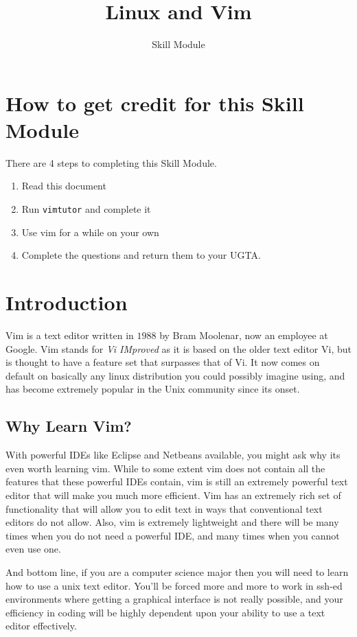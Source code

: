 

\title{Linux and Vim}
\author{Skill Module}
\date{}


\maketitle

\section{How to get credit for this Skill Module}
There are 4 steps to completing this Skill Module.
\begin{enumerate}
\item Read this document
\item Run \texttt{vimtutor} and complete it
\item Use vim for a while on your own
\item Complete the questions and return them to your UGTA.
\end{enumerate}

\section{Introduction}
Vim is a text editor written in $1988$ by Bram Moolenar, now an
employee at Google. Vim stands for {\em Vi IMproved} as it is based
on the older text editor Vi, but is thought to have a feature set
that surpasses that of Vi. It now comes on default on basically any
linux distribution you could possibly imagine using, and has become
extremely popular in the Unix community since its onset. 

\subsection{Why Learn Vim?}
With powerful IDEs like Eclipse and Netbeans available, you might ask why
its even worth learning vim. While to some extent vim does not contain
all the features that these powerful IDEs contain, vim is still an 
extremely powerful text editor that will make you much more efficient.
Vim has an extremely rich set of functionality that will allow you to 
edit text in ways that conventional text editors do not allow. Also,
vim is extremely lightweight and there will be many times when you
do not need a powerful IDE, and many times when you cannot even use one.

And bottom line, if you are a computer science major then you will need
to learn how to use a unix text editor. You'll be forced more and more
to work in ssh-ed environments where getting a graphical interface is not
really possible, and your efficiency in coding will be highly dependent
upon your ability to use a text editor effectively.

